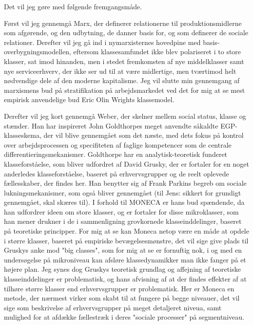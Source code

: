  









Det vil jeg gøre med følgende fremgangsmåde. 

Først vil jeg gennemgå Marx, der definerer relationerne til produktionsmidlerne som afgørende, og den udbytning, de danner basis for, og som definerer de sociale relationer. Derefter vil jeg gå ind i nymarxisternes hovedpine med basis-overbygningsmodellen, eftersom klassesamfundet ikke blev polariseret i to store klasser, sat imod hinanden, men i stedet fremkomsten af nye middelklasser samt nye serviceerhverv, der ikke ser ud til at være midlertige, men tværtimod helt nødvendige dele af den moderne kapitalisme. Jeg vil slutte min gennemgang af marxismens bud på stratifikation på arbejdsmarkedet ved det for mig at se mest empirisk anvendelige bud Eric Olin Wrights klassemodel.

Derefter vil jeg kort gennemgå Weber, der skelner mellem social status, klasse og stænder. Han har inspireret John Goldthorpes meget anvendte såkaldte EGP-klasseskema, der vil blive gennemgået som det næste, med dets fokus på kontrol over arbejdsprocessen og specifiteten af faglige kompetencer som de centrale differentieringsmekanismer. Goldthorpe har en analytisk-teoretisk funderet klasseforståelse, som bliver udfordret af David Grusky, der er fortaler for en noget anderledes klasseforståelse, baseret på erhvervsgrupper og de reelt oplevede fællesskaber, der findes her. Han benytter sig af Frank Parkins begreb om sociale lukningsmekanismer, som også bliver gennemgået (til Jens: sikkert for grundigt gennemgået, skal skæres til). I forhold til MONECA er hans bud spændende, da han udfordrer ideen om store klasser, og er fortaler for disse mikroklasser, som han mener drukner i de i sammenligning grovkornede klasseinddelinger, baseret på teoretiske principper. For mig at se kan Moneca netop være en måde at opdele i større klasser, baseret på empiriske bevægelsesmønstre, det vil sige give plads til Gruskys anke mod "big classes", som for mig at se er fornuftig nok, i og med en undersøgelse på mikroniveau kan afsløre klassedynamikker man ikke fanger på et højere plan. Jeg synes dog Gruskys teoretisk grundlag og affejning af teoretiske klasseinddelinger er problematisk, og hans afvisning af at der findes effekter af at tilhøre større klasser end erhvervsgrupper er problematisk. Her er Moneca en metode, der nærmest virker som skabt til at fungere på begge niveauer, det vil sige som beskrivelse af erhvervsgrupper på meget detaljeret niveua, samt mulighed for at afdække fællestræk i deres "sociale processer" på segmentniveau.

